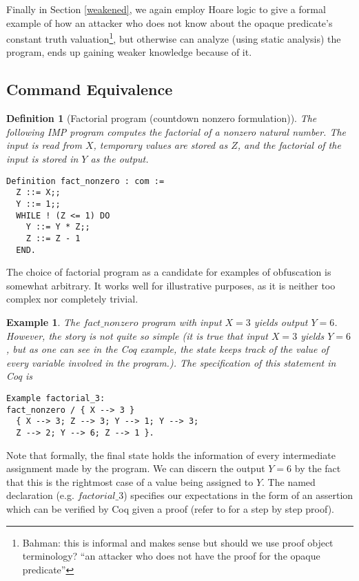 \documentclass[compsoc,conference,a4paper,10pt,times]{IEEEtran}
\newtheorem{defin}[theorem]{Definition}
\newtheorem{example}[theorem]{Example}
\begin{document}
Finally in Section \ref{weakened}, we again employ Hoare logic to give a formal example of how an attacker who does not know about the opaque predicate's constant truth valuation\footnote{Bahman: this is informal and makes sense but should we use proof object terminology? ``an attacker who does not have the proof for the opaque predicate''}, but otherwise can analyze (using static analysis) the program, ends up gaining weaker knowledge because of it.

\subsection{Command Equivalence}\label{naive}
\begin{defin}[Factorial program (countdown nonzero formulation)]\label{Fact}
    The following IMP program computes the factorial of a nonzero natural number.  The input is read from $X$, temporary values are stored as $Z$, and the factorial of the input is stored in $Y$ as the output.
\begin{verbatim}
Definition fact_nonzero : com :=
  Z ::= X;;
  Y ::= 1;;
  WHILE ! (Z <= 1) DO
    Y ::= Y * Z;;
    Z ::= Z - 1
  END.
\end{verbatim}
\end{defin}

    The choice of factorial program as a candidate for examples of obfuscation is somewhat arbitrary.  It works well for illustrative purposes, as it is neither too complex nor completely trivial.

\begin{example}\label{firstoff}
    The $fact\_nonzero$ program with input $X=3$ yields output $Y=6$.  However, the story is not quite so simple (it is true that input $X=3$ yields $Y=6$, but as one can see in the Coq example, the state keeps track of the value of every variable involved in the program.).  The specification of this statement in Coq is
\begin{verbatim}
Example factorial_3: 
fact_nonzero / { X --> 3 } 
  { X --> 3; Z --> 3; Y --> 1; Y --> 3; 
  Z --> 2; Y --> 6; Z --> 1 }.
\end{verbatim}
\end{example}
    Note that formally, the final state holds the information of every intermediate assignment made by the program.  We can discern the output $Y=6$ by the fact that this is the rightmost case of a value being assigned to $Y$. The named declaration (e.g. $factorial\_3$) specifies our expectations in the form of an assertion which can be verified by Coq given a proof (refer to \cite{WeiRepo} for a step by step proof). 
    
\end{document}
